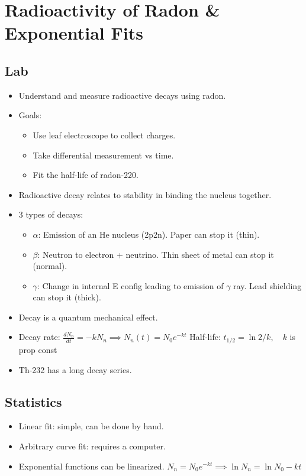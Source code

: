 \documentclass[twocolumn]{article}
\begin{document}
\section{Radioactivity of Radon \& Exponential Fits}
\subsection{Lab}
\begin{itemize}
    \item Understand and measure radioactive decays using radon.
    \item Goals:
    \begin{itemize}
        \item Use leaf electroscope to collect charges.
        \item Take differential measurement vs time.
        \item Fit the half-life of radon-220.
    \end{itemize}
    \item Radioactive decay relates to stability in binding the nucleus together.
    \item 3 types of decays:
    \begin{itemize}
        \item $\alpha$: Emission of an He nucleus (2p2n). Paper can stop it (thin).
        \item $\beta$: Neutron to electron + neutrino. Thin sheet of metal can stop it (normal).
        \item $\gamma$: Change in internal E config leading to emission of $\gamma$ ray. Lead shielding can stop it (thick).
    \end{itemize}
    \item Decay is a quantum mechanical effect.
    \item Decay rate: $\frac{dN_n}{dt} = -kN_n \implies N_n(t) = N_0 e^{-kt}$
    \subitem Half-life: $t_{1/2} = \ln 2 / k, \quad k$ is prop const
    \item Th-232 has a long decay series.
\end{itemize}

\subsection{Statistics}
\begin{itemize}
    \item Linear fit: simple, can be done by hand.
    \item Arbitrary curve fit: requires a computer.
    \item Exponential functions can be linearized.
    \subitem $N_n = N_0 e^{-kt} \implies \ln N_n = \ln N_0 - kt$
\end{itemize}
\end{document}

